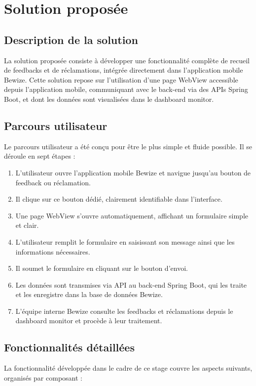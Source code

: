 \section{Solution proposée}

\subsection{Description de la solution}
La solution proposée consiste à développer une fonctionnalité complète 
de recueil de feedbacks et de réclamations, intégrée directement dans 
l'application mobile Bewize. Cette solution repose sur l'utilisation 
d'une page WebView accessible depuis l'application mobile, communiquant 
avec le back-end via des APIs Spring Boot, et dont les données sont 
visualisées dans le dashboard monitor.

\subsection{Parcours utilisateur}
Le parcours utilisateur a été conçu pour être le plus simple et fluide 
possible. Il se déroule en sept étapes :

\begin{enumerate}
    \item L'utilisateur ouvre l'application mobile Bewize et navigue 
    jusqu'au bouton de feedback ou réclamation.
    \item Il clique sur ce bouton dédié, clairement identifiable 
    dans l'interface.
    \item Une page WebView s'ouvre automatiquement, affichant un 
    formulaire simple et clair.
    \item L'utilisateur remplit le formulaire en saisissant son message 
    ainsi que les informations nécessaires.
    \item Il soumet le formulaire en cliquant sur le bouton d'envoi.
    \item Les données sont transmises via API au back-end Spring Boot, 
    qui les traite et les enregistre dans la base de données Bewize.
    \item L'équipe interne Bewize consulte les feedbacks et réclamations 
    depuis le dashboard monitor et procède à leur traitement.
\end{enumerate}

\subsection{Fonctionnalités détaillées}
La fonctionnalité développée dans le cadre de ce stage couvre les 
aspects suivants, organisés par composant :

